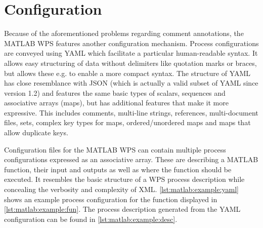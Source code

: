   \section{Configuration}
    \label{sec:matlab:conf}
    Because of the aforementioned problems regarding comment annotations, the MATLAB WPS features another configuration mechanism. Process configurations are conveyed using YAML \citep{yaml} which facilitate a particular human-readable syntax. It allows easy structuring of data without delimiters like quotation marks or braces, but allows these e.g. to enable a more compact syntax. The structure of YAML has close resemblance with JSON (which is actually a valid subset of YAML since version 1.2) and features the same basic types of scalars, sequences and associative arrays (maps), but has additional features that make it more expressive. This includes comments, multi-line strings, references, multi-document files, sets, complex key types for maps, ordered/unordered maps and maps that allow duplicate keys.
    
    Configuration files for the MATLAB WPS can contain multiple process configurations expressed as an associative array. These are describing a MATLAB function, their input and outputs as well as where the function should be executed. It resembles the basic structure of a WPS process description while concealing the verbosity and complexity of XML. \cref{lst:matlab:example:yaml} shows an example process configuration for the function displayed in \cref{lst:matlab:example:fun}. The process description generated from the YAML configuration can be found in \cref{lst:matlab:example:desc}.

